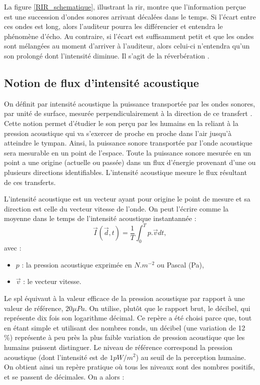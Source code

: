 La figure \ref{RIR_schematique}, illustrant la \gls{rir}, montre que l'information perçue est une succession d'ondes sonores arrivant décalées dans le temps. Si l'écart entre ces ondes est long, alors l'auditeur pourra les différencier et entendra le phénomène d'écho. Au contraire, si l'écart est suffisamment petit et que les ondes sont mélangées au moment d'arriver à l'auditeur, alors celui-ci n'entendra qu'un son prolongé dont l'intensité diminue. Il s'agit de la réverbération \cite[p. 39]{sabine}. 





\subsection{Notion de flux d'intensité acoustique} \label{sect_intensite}
On définit par intensité acoustique la puissance transportée par les ondes sonores, par unité de surface, mesurée perpendiculairement à la direction de ce transfert \cite[IEC 60050]{cei}. Cette notion permet d'étudier le son perçu par les humains en la reliant à la pression acoustique qui va s'exercer de proche en proche dans l'air jusqu'à atteindre le tympan. Ainsi, la puissance sonore transportée par l'onde acoustique sera mesurable en un point de l'espace. Toute la puissance sonore mesurée en un point a une origine (actuelle ou passée) dans un flux d'énergie provenant d'une ou plusieurs directions identifiables. L'intensité acoustique mesure le flux résultant de ces transferts. 

L'intensité acoustique est un vecteur ayant pour origine le point de mesure et sa direction est celle du vecteur vitesse de l'onde. On peut l'écrire comme la moyenne dans le temps de l'intensité acoustique instantannée :
\begin{equation} 
\overrightarrow{I}(\overrightarrow{d},t) = \frac{1}{T} \int^T_0 p.\overrightarrow{v}dt,
\end{equation}
avec : 
\begin{itemize}
\item $p$ : la pression acoustique exprimée en $N.m^{-2}$ ou Pascal (Pa),
\item $\overrightarrow{v}$  : le vecteur vitesse.
\end{itemize}

Le \gls{spl} équivaut à la valeur efficace de la pression acoustique par rapport à une valeur de référence, $20 \mu Pa$. On utilise, plutôt que le rapport brut, le décibel, qui représente dix fois son logarithme décimal. Ce repère a été choisi parce que, tout en étant simple et utilisant des nombres ronds, un décibel (une variation de 12 \%) représente à peu près la plus faible variation de pression acoustique que les humains puissent distinguer. Le niveau de référence correspond la pression acoustique (dont l'intensité est de $1 pW/m^2$) au seuil de la perception humaine. On obtient ainsi un repère pratique où tous les niveaux sont des nombres positifs, et se passent de décimales. On a alors :

